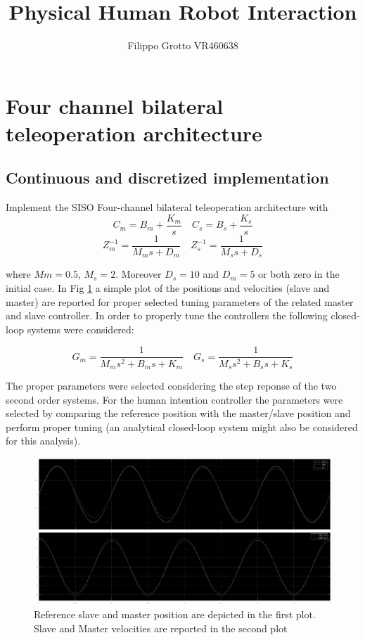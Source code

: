 \documentclass[a4paper,12pt]{article}
\begin{document}
\author{Filippo Grotto VR460638}

\title{Physical Human Robot Interaction}

\maketitle
\tableofcontents

\section{Four channel bilateral teleoperation architecture}

\subsection{Continuous and discretized implementation}
Implement the SISO Four-channel bilateral teleoperation architecture with
\[
    C_m = B_m + \frac{K_m}{s} \quad
    C_s = B_s + \frac{K_s}{s}
\]
\[
    Z_m^{-1} = \frac{1}{M_ms + D_m} \quad
    Z_s^{-1} = \frac{1}{M_ss + D_s}
\]

\bigskip
\noindent where $Mm = 0.5$, $M_s = 2$. Moreover $D_s = 10$ and $D_m = 5$ or both zero in the initial case. In Fig \ref{fig:hw1} a simple plot of the positions and velocities (slave and master) are reported for proper selected tuning parameters of the related master and slave controller. In order to properly tune the controllers the following closed-loop systems were considered:

\[
G_m = \frac{1}{M_ms^2+B_ms+K_m} \quad
G_s = \frac{1}{M_ss^2+B_ss+K_s}
\]

\bigskip
\noindent The proper parameters were selected considering the step reponse of the two second order systems. For the human intention controller the parameters were selected by comparing the reference position with the master/slave position and perform proper tuning (an analytical closed-loop system might also be considered for this analysis).

\begin{figure}[H]
    \begin{center}
        \hspace*{-2cm}
        \includegraphics[scale=0.39]{images/hw1.eps}
    \end{center}
    \caption{Reference slave and master position are depicted in the first plot. Slave and Master velocities are reported in the second plot}
    \label{fig:hw1}
\end{figure}
\end{document}
